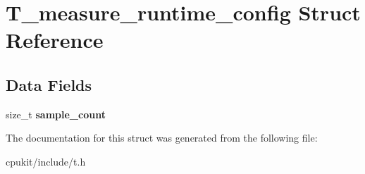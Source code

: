 \hypertarget{structT__measure__runtime__config}{}\section{T\+\_\+measure\+\_\+runtime\+\_\+config Struct Reference}
\label{structT__measure__runtime__config}
\subsection*{Data Fields}
\begin{DoxyCompactItemize}
\item 
\mbox{\label{structT__measure__runtime__config_ab14c95373fbaa8a170871d8d90297b9f}} 
size\+\_\+t {\bfseries sample\+\_\+count}
\end{DoxyCompactItemize}


The documentation for this struct was generated from the following file\+:\begin{DoxyCompactItemize}
\item 
cpukit/include/t.\+h\end{DoxyCompactItemize}
